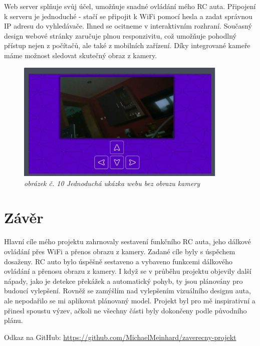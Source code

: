 \documentclass[12pt, a4paper,
oneside,      %
openany
]{report}
\begin{document}
    \noindent Web server splňuje svůj účel, umožňuje snadné ovládání mého RC auta. Připojení k serveru je jednoduché - stačí se připojit k WiFi pomocí hesla a zadat správnou IP adresu do vyhledávače. Ihned se ocitneme v interaktivním rozhraní. Současný design webové stránky zaručuje plnou responzivitu, což umožňuje pohodlný přístup nejen z počítačů, ale také z mobilních zařízení. Díky integrované kameře máme možnost sledovat skutečný obraz z kamery.
    \begin{figure}[H]
    \centering
	\includegraphics[width=0.9\textwidth]{image/web.png}
    \caption*{\textit{obrázek č. 10 Jednoduchá ukázka webu bez obrazu kamery}}
    \label{fig:webDesign}
\end{figure}
 
	\chapter*{Závěr}
	\noindent Hlavní cíle mého projektu zahrnovaly sestavení funkčního RC auta, jeho dálkové ovládání přes WiFi a přenos obrazu z kamery. Zadané cíle byly s úspěchem dosaženy. RC auto bylo úspěšně sestaveno a vybaveno funkcemi dálkového ovládání a přenosu obrazu z kamery. I když se v průběhu projektu objevily další nápady, jako je detekce překážek a automatický pohyb, ty jsou plánovány pro budoucí vylepšení. Rovněž se zamýšlím nad vylepšením vizuálního designu auta, ale nepodařilo se mi aplikovat plánovaný model. Projekt byl pro mě inspirativní a přinesl spoustu výzev, ačkoli ne všechny části byly dokončeny podle původního plánu.

    \noindent Odkaz na GitHub: \href{https://github.com/MichaelMeinhard/zaverecny-projekt}{https://github.com/MichaelMeinhard/zaverecny-projekt}
	
\end{document}
